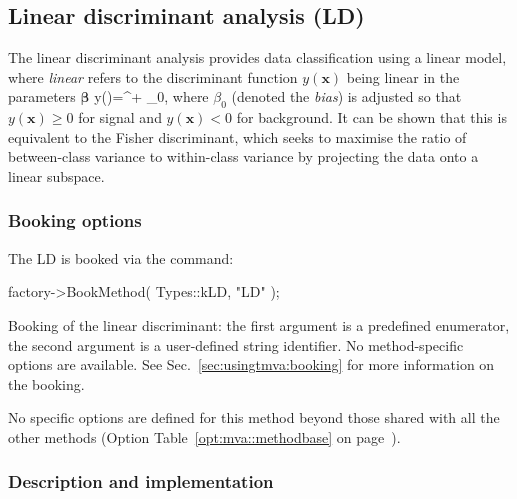 \subsection{Linear discriminant analysis (LD)}
\label{sec:ld}

The linear discriminant analysis provides data classification using a linear model, 
where \textit{linear} refers to the discriminant function $y(\mathbf{x})$ being 
linear in the parameters $\mathbf{\beta}$
\beq
	y()=^\top\beta + \beta_0\;,
\eeq
where $\beta_0$ (denoted the {\em bias}) is adjusted so that $y(\mathbf{x})\geq0$ 
for signal and $y(\mathbf{x})<0$ for background. It can be shown that this is equivalent 
to the Fisher discriminant, which seeks to maximise the ratio of between-class 
variance to within-class variance by projecting the data onto a linear subspace.

\subsubsection{Booking options}

The LD is booked via the command:
\begin{codeexample}
\begin{tmvacode}
factory->BookMethod( Types::kLD, "LD" );
\end{tmvacode}
\caption[.]{\codeexampleCaptionSize Booking of the linear discriminant: the first argument is 
		   a predefined enumerator, the second argument is a user-defined 
	   	string identifier. No method-specific options are available.
        See Sec.~\ref{sec:usingtmva:booking} for more information on the booking.}
\end{codeexample}

No specific options are defined for this method beyond those shared with all the other 
methods (\cf Option Table~\ref{opt:mva::methodbase} on page~\pageref{opt:mva::methodbase}).

\subsubsection{Description and implementation}

